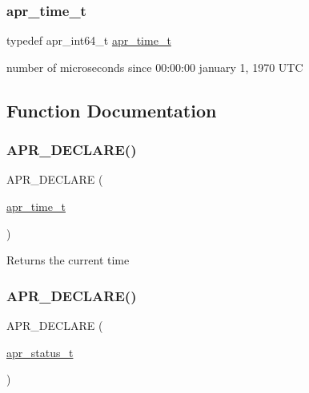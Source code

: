 \subsubsection{\texorpdfstring{apr\+\_\+time\+\_\+t}{apr\_time\_t}}
{\footnotesize\ttfamily typedef apr\+\_\+int64\+\_\+t \mbox{\hyperlink{group__apr__time_gadb4bde16055748190eae190c55aa02bb}{apr\+\_\+time\+\_\+t}}}

number of microseconds since 00\+:00\+:00 january 1, 1970 U\+TC 

\subsection{Function Documentation}
\mbox{\label{group__apr__time_ga0151b93f22f81f7b1af9bc4dfcd11f86}} 
\subsubsection{\texorpdfstring{A\+P\+R\+\_\+\+D\+E\+C\+L\+A\+R\+E()}{APR\_DECLARE()}\hspace{0.1cm}{\footnotesize\ttfamily [1/3]}}
{\footnotesize\ttfamily A\+P\+R\+\_\+\+D\+E\+C\+L\+A\+RE (\begin{DoxyParamCaption}\item[{\mbox{\hyperlink{group__apr__time_gadb4bde16055748190eae190c55aa02bb}{apr\+\_\+time\+\_\+t}}}]{ }\end{DoxyParamCaption})}

\begin{DoxyReturn}{Returns}
the current time 
\end{DoxyReturn}
\mbox{\label{group__apr__time_ga57bfe39a9516843a151a65cd02f84616}} 
\subsubsection{\texorpdfstring{A\+P\+R\+\_\+\+D\+E\+C\+L\+A\+R\+E()}{APR\_DECLARE()}\hspace{0.1cm}{\footnotesize\ttfamily [2/3]}}
{\footnotesize\ttfamily A\+P\+R\+\_\+\+D\+E\+C\+L\+A\+RE (\begin{DoxyParamCaption}\item[{\mbox{\hyperlink{group__apr__errno_gaf76ee4543247e9fb3f3546203e590a6c}{apr\+\_\+status\+\_\+t}}}]{ }\end{DoxyParamCaption})}

